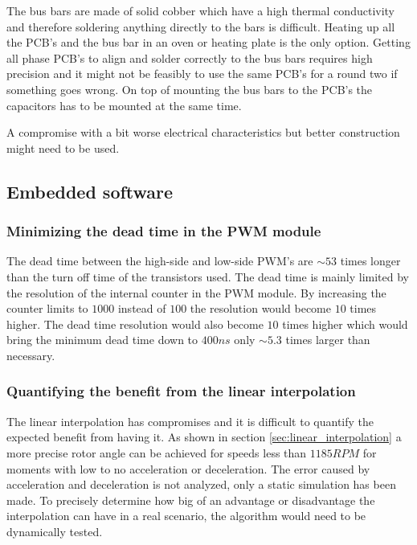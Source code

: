 The bus bars are made of solid cobber which have a high thermal conductivity and therefore soldering anything directly to the bars is difficult. Heating up all the PCB's and the bus bar in an oven or heating plate is the only option. 
Getting all phase PCB's to align and solder correctly to the bus bars requires high precision and it might not be feasibly to use the same PCB's for a round two if something goes wrong.
On top of mounting the bus bars to the PCB's the capacitors has to be mounted at the same time. 

A compromise with a bit worse electrical characteristics but better construction might need to be used.

\subsection{Embedded software}

\subsubsection{Minimizing the dead time in the PWM module}

The dead time between the high-side and low-side PWM's are $\sim 53$ times longer than the turn off time of the transistors used. The dead time is mainly limited by the resolution of the internal counter in the PWM module. By increasing the counter limits to $1000$ instead of $100$ the resolution would become $10$ times higher. The dead time resolution would also become $10$ times higher which would bring the minimum dead time down to $400ns$ only $\sim 5.3$ times larger than necessary.


\subsubsection{Quantifying the benefit from the linear interpolation}
The linear interpolation has compromises and it is difficult to quantify the expected benefit from having it. As shown in section \ref{sec:linear_interpolation} a more precise rotor angle can be achieved for speeds less than $1185RPM$ for moments with low to no acceleration or deceleration. The error caused by acceleration and deceleration is not analyzed, only a static simulation has been made. To precisely determine how big of an advantage or disadvantage the interpolation can have in a real scenario, the algorithm would need to be dynamically tested.




 
 